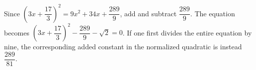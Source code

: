 Since $(3x+\dfrac{17}{3})^2=9x^2+34x+\dfrac{289}{9}$, add and subtract $\boxed{\dfrac{289}{9}}$. The equation becomes $(3x+\dfrac{17}{3})^2-\dfrac{289}{9}-\sqrt2=0$. If one first divides the entire equation by nine, the corresponding added constant in the normalized quadratic is instead $\dfrac{289}{81}$.
